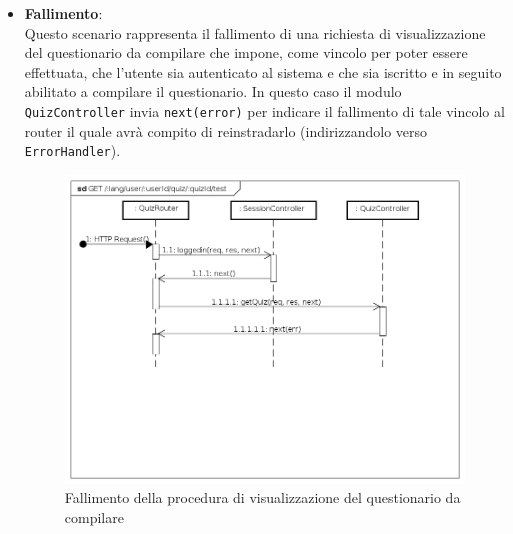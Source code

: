 \begin{itemize}
\item \textbf{Fallimento}:\\
Questo scenario rappresenta il fallimento di una richiesta di visualizzazione del questionario da compilare che impone, come vincolo per poter essere effettuata, che l'utente sia autenticato al sistema e che sia iscritto e in seguito abilitato a compilare il questionario. In questo caso il modulo \texttt{QuizController} invia \texttt{next(error)} per indicare il fallimento di tale vincolo al router il quale avrà compito di reinstradarlo (indirizzandolo verso \texttt{ErrorHandler}).
\label{Fallimento della procedura di visualizzazione del questionario da compilare}
\begin{figure}[ht]
	\centering
	\includegraphics[scale=0.40]{UML/DiagrammiDiSequenza/Back-end/GET__lang_user_userId_quiz_quizId_test_failure.png}
	\caption{Fallimento della procedura di visualizzazione del questionario da compilare}
\end{figure}
\FloatBarrier
\end{itemize}

